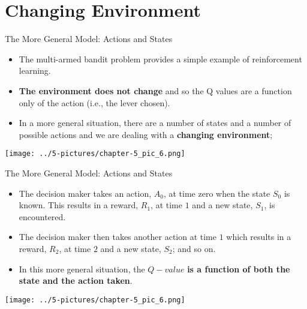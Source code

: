 \documentclass[11pt]{beamer}
\begin{document}
\section{Changing Environment}
\begin{frame}{The More General Model: Actions and States }
\footnotesize
\begin{itemize}
\item The multi-armed bandit problem provides a simple example of reinforcement
learning. 
\item \textbf{The environment does not change} and so the Q values
are a function only of the action (i.e., the lever chosen). 
\item In a more general situation, there are a number of states and a number of possible actions and we are dealing with a \textbf{changing environment};
\end{itemize}
	\begin{center}
	\texttt{[image: ../5-pictures/chapter-5\_pic\_6.png]}
	\end{center}
\end{frame}
\begin{frame}{The More General Model: Actions and States }
\footnotesize
\begin{itemize}
\item The decision maker takes an
action, $A_0$, at time zero when the state $S_0$ is known. This results in a reward, $R_1$, at time $1$ and a new state, $S_1$, is encountered. 
\item The decision
maker then takes another action at time $1$ which results in a reward, $R_2$,
at time $2$ and a new state, $S_2$; and so on. 
\item In this more general situation,
the $Q-value$ \textbf{is a function of both the state and the action taken}.
\end{itemize}
	\begin{center}
	\texttt{[image: ../5-pictures/chapter-5\_pic\_6.png]}
	\end{center}
\end{frame}
\end{document}
